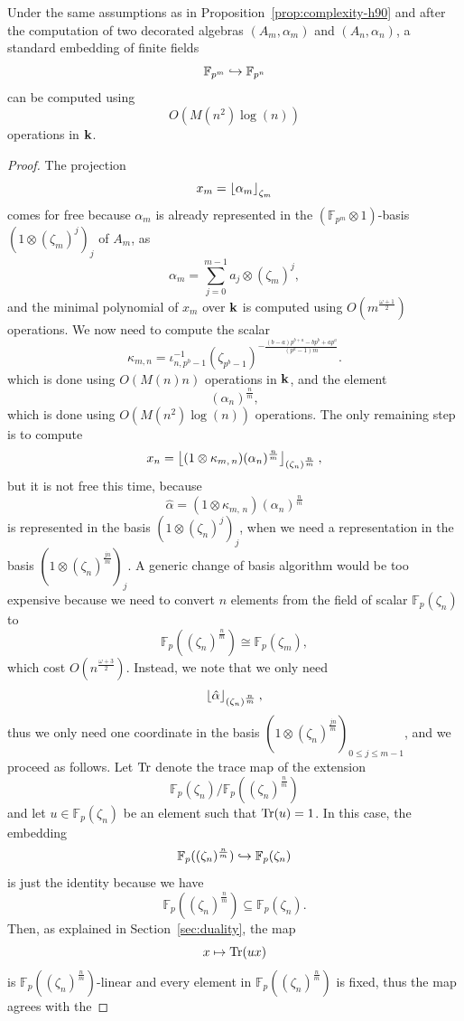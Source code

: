 \begin{prop}
Under the same assumptions as in Proposition~\ref{prop:complexity-h90} and
after the computation of two decorated algebras $(A_m,\alpha_m)$ and $(A_n,\alpha_n)$, a standard
embedding of finite fields
\[
  \mathbb{F}_{p^m}\hookrightarrow\mathbb{F}_{p^{n}}
\]
can be computed using 
\[
  O(M(n^2)\log(n))
\]
operations in $\mathbf{k}$.
\end{prop}
\begin{proof}
The projection
\[
  x_m = \left\lfloor \alpha_m \right\rfloor_{\zeta_m}
\]
comes for free because $\alpha_m$ is already represented in the
$(\mathbb{F}_{p^{m}}\otimes1)$-basis $(1\otimes(\zeta_m)^j)_j$ of $A_m$, \ie as
\[
  \alpha_m = \sum_{j=0}^{m-1}a_j\otimes(\zeta_m)^j,
\]
and the minimal polynomial of $x_m$ over $\mathbf{k}$ is computed using
$O(m^{\frac{\omega+1}{2}})$ operations. We now need to compute the scalar
\[
   \kappa_{m, n} = \iota_{n,
   p^b-1}^{-1}(\zeta_{p^b-1})^{-\frac{(b-a)p^{b+a}-bp^b+ap^a}{(p^a-1)m}}.
\]
which is done using $O(M(n)n)$ operations in $\mathbf{k}$, and the element
\[
  (\alpha_n)^{\frac{n}{m}},
\]
which is done using $O(M(n^2)\log(n))$ operations. The only remaining step is
to compute
\[
  x_n = \left\lfloor (1\otimes\kappa_{m,\,n})(\alpha_{n})^{\frac{n}{m}} \right\rfloor_{(\zeta_n)^{\frac{n}{m}}},
\]
but it is not free this time, because
\[
  \hat\alpha = (1\otimes\kappa_{m,\,n})(\alpha_{n})^{\frac{n}{m}}
\]
is represented in the basis $(1\otimes(\zeta_n)^j)_j$, when we need a representation
in the basis $(1\otimes(\zeta_n)^{\frac{jn}{m}})_j$. A generic change of basis
algorithm would be too expensive because we need to convert $n$ elements from
the field of scalar $\mathbb{F}_{p}(\zeta_n)$ to
\[
  \mathbb{F}_p( (\zeta_n)^{\frac{n}{m}}) \cong \mathbb{F}_p(\zeta_m),
\]
which cost $O(n^{\frac{\omega+3}{2}})$. Instead, we note that we only need
\[
  \left\lfloor \hat\alpha \right\rfloor_{(\zeta_n)^{\frac{n}{m}}},
\]
thus we only need one coordinate in the basis
$(1\otimes(\zeta_n)^{\frac{jn}{m}})_{0\leq j\leq m-1}$, and we proceed as follows. Let $\operatorname{Tr}$ denote
the trace map of the extension
\[
  \mathbb{F}_p(\zeta_n) / \mathbb{F}_p( (\zeta_n)^{\frac{n}{m}})
\]
and let $u\in\mathbb{F}_p(\zeta_n)$ be an element such that $\operatorname{Tr}(u)=1$.
In this case, the embedding 
\[
  \mathbb{F}_p( (\zeta_n)^{\frac{n}{m}})\hookrightarrow\mathbb{F}_p(\zeta_n) 
\]
is just the identity because we have 
\[
  \mathbb{F}_p( (\zeta_n)^{\frac{n}{m}})\subseteq\mathbb{F}_p(\zeta_n).
\]
Then, as explained in Section~\ref{sec:duality}, the map
\[
  x\mapsto\operatorname{Tr}(ux)
\]
is $\mathbb{F}_p( (\zeta_n)^{\frac{n}{m}})$-linear and every element in
$\mathbb{F}_p((\zeta_n)^{\frac{n}{m}})$ is fixed, thus the map agrees with the

\end{proof}
